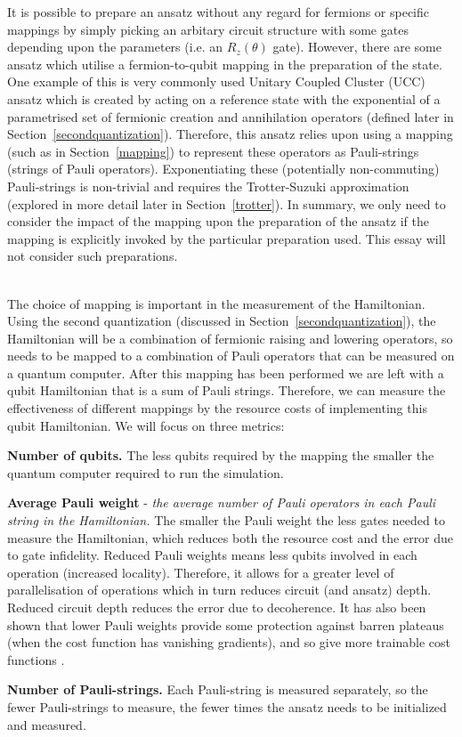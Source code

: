 \documentclass[twoside]{article}
\begin{document}
\begin{romanlist}
\item It is possible to prepare an ansatz without any regard for fermions or specific mappings by simply picking an arbitary circuit structure with some gates depending upon the parameters (i.e. an $R_z(\theta)$ gate). However, there are some ansatz which utilise a fermion-to-qubit mapping in the preparation of the state. One example of this is very commonly used Unitary Coupled Cluster (UCC) ansatz which is created by acting on a reference state with the exponential of a parametrised set of fermionic creation and annihilation operators (defined later in Section~\ref{secondquantization}). Therefore, this ansatz relies upon using a mapping (such as in Section~\ref{mapping}) to represent these operators as Pauli-strings (strings of Pauli operators). Exponentiating these (potentially non-commuting) Pauli-strings is non-trivial and requires the Trotter-Suzuki approximation (explored in more detail later in Section~\ref{trotter}). In summary, we only need to consider the impact of the mapping upon the preparation of the ansatz if the mapping is explicitly invoked by the particular preparation used. This essay will not consider such preparations.\\\\
\item The choice of mapping is important in the measurement of the Hamiltonian. Using the second quantization (discussed in Section~\ref{secondquantization}), the Hamiltonian will be a combination of fermionic raising and lowering operators, so needs to be mapped to a combination of Pauli operators that can be measured on a quantum computer. After this mapping has been performed we are left with a qubit Hamiltonian that is a sum of Pauli strings. Therefore, we can measure the effectiveness of different mappings by the resource costs of implementing this qubit Hamiltonian. We will focus on three metrics:
\begin{alphlist}
\item \textbf{Number of qubits.} The less qubits required by the mapping the smaller the quantum computer required to run the simulation.
\item \textbf{Average Pauli weight}{ - \it the average number of Pauli operators in each Pauli string in the Hamiltonian.} The smaller the Pauli weight the less gates needed to measure the Hamiltonian, which reduces both the resource cost and the error due to gate infidelity. Reduced Pauli weights means less qubits involved in each operation (increased locality). Therefore, it allows for a greater level of parallelisation of operations which in turn reduces circuit (and ansatz) depth. Reduced circuit depth reduces the error due to decoherence. It has also been shown that lower Pauli weights provide some protection against barren plateaus (when the cost function has vanishing gradients), and so give more trainable cost functions \cite{barrenplat}. 
\item \textbf{Number of Pauli-strings.} Each Pauli-string is measured separately, so the fewer Pauli-strings to measure, the fewer times the ansatz needs to be initialized and measured.
\end{alphlist}
\end{romanlist}
\end{document}
